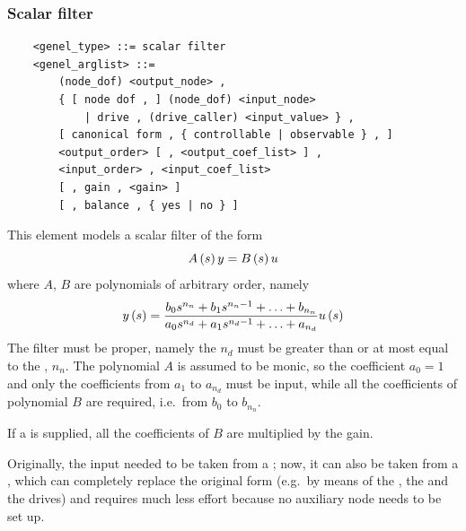 \subsubsection{Scalar filter}
\label{sec:EL:GENEL:SCALAR-FILTER}
\begin{verbatim}
    <genel_type> ::= scalar filter
    <genel_arglist> ::=
        (node_dof) <output_node> ,
        { [ node dof , ] (node_dof) <input_node>
            | drive , (drive_caller) <input_value> } ,
        [ canonical form , { controllable | observable } , ]
        <output_order> [ , <output_coef_list> ] ,
        <input_order> , <input_coef_list>
        [ , gain , <gain> ]
        [ , balance , { yes | no } ]
\end{verbatim}
This element models a scalar filter of the form
\begin{displaymath}
    A\left( s \right)y = B\left( s \right)u
\end{displaymath}
where $ A $, $ B $ are polynomials of arbitrary order, namely
\begin{displaymath}
	y\left( s \right) = \frac{
		b_0 s^{n_n}
		+ b_1 s^{n_n-1}
		+ \ldots
		+ b_{n_n}
	}{
		a_0 s^{n_d}
		+ a_1 s^{n_d-1}
		+ \ldots
		+ a_{n_d}
	} u\left( s \right)
\end{displaymath}
The filter must be proper, namely the  $n_d$
must be greater than or at most equal to the , $n_n$.
The polynomial $ A $ is assumed to be monic, so the coefficient 
$a_0=1$ and only the coefficients from $a_1$ to $a_{n_d}$ must be input,
while all the coefficients of polynomial $ B $ are required,
i.e.\ from $b_0$ to $b_{n_n}$.

If a  is supplied, all the coefficients of $ B $
are multiplied by the gain.

Originally, the input needed to be taken from a ;
now, it can also be taken from a , which can completely replace
the original form (e.g.\ by means of the , the 
and the  drives) and requires much less effort because
no auxiliary node needs to be set up.

